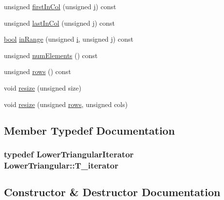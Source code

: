 \begin{DoxyCompactItemize}
\item 
unsigned \hyperlink{classLowerTriangular_ab66ec9810ef7cb7843d121fc755f772b}{first\+In\+Col} (unsigned \hyperlink{indexexpr_8h_aa1f3325d66516548e69238097857fa98}{j}) const 
\item 
unsigned \hyperlink{classLowerTriangular_a640586ab8c0e475892798d3313365d49}{last\+In\+Col} (unsigned \hyperlink{indexexpr_8h_aa1f3325d66516548e69238097857fa98}{j}) const 
\item 
\hyperlink{compiler_8h_abb452686968e48b67397da5f97445f5b}{bool} \hyperlink{classLowerTriangular_a054536ca8f4673c5641068a159e0a5d1}{in\+Range} (unsigned \hyperlink{indexexpr_8h_aabd77643995707c185e95c8cb2782c81}{i}, unsigned \hyperlink{indexexpr_8h_aa1f3325d66516548e69238097857fa98}{j}) const 
\item 
unsigned \hyperlink{classLowerTriangular_a44b436551cbb7daa25c1af18c4577a6c}{num\+Elements} () const 
\item 
unsigned \hyperlink{classLowerTriangular_a6836cbda5d17d0533b7e9a11212b6067}{rows} () const 
\item 
void \hyperlink{classLowerTriangular_a4df06de907b81d14fea6f5c9f4086369}{resize} (unsigned size)
\item 
void \hyperlink{classLowerTriangular_ad16b70f99811b5fae95de5461c403486}{resize} (unsigned \hyperlink{classLowerTriangular_a6836cbda5d17d0533b7e9a11212b6067}{rows}, unsigned cols)
\end{DoxyCompactItemize}


\subsection{Member Typedef Documentation}
\hypertarget{classLowerTriangular_ad2f4644d5de76f582810385ccfd2b176}{}
\subsubsection[{T\+\_\+iterator}]{\setlength{\rightskip}{0pt plus 5cm}typedef {\bf Lower\+Triangular\+Iterator} {\bf Lower\+Triangular\+::\+T\+\_\+iterator}}\label{classLowerTriangular_ad2f4644d5de76f582810385ccfd2b176}


\subsection{Constructor \& Destructor Documentation}
\hypertarget{classLowerTriangular_af8e9f2c82a2537e00a6eb9de2862c45c}{}
